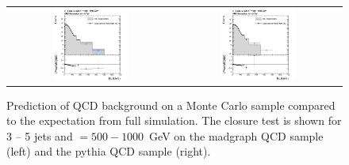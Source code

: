\begin{figure}[h]
  \centering
  \begin{tabular}{cc}
                \includegraphics[width=0.47\textwidth]{figures/MHT_JetBin2_HTlow_madgraph_DR53X_chs_TuneZ2star_pt10_withoutPUReweighting_UseRebCorrection_v1.png} &
                \includegraphics[width=0.47\textwidth]{figures/MHT_JetBin2_HTlow_pythia_DR53X_chs_TuneZ2star_pt10_withoutPUReweighting_UseRebCorrection_v1.png}\\
  \end{tabular}
  \caption{Prediction of QCD background on a Monte Carlo sample compared to the expectation from full simulation. The closure test is shown for 3 -- 5 jets and \HT $= 500 - 1000$~GeV on the madgraph QCD sample (left) and the pythia QCD sample (right).}
  \label{fig:qcd_rs_closure_comp}
\end{figure}

